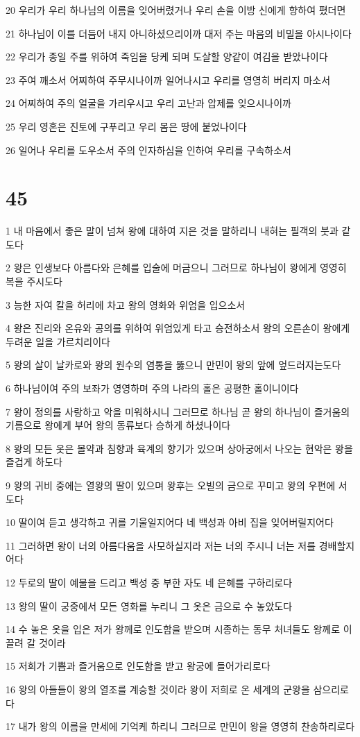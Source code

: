 \par 20 우리가 우리 하나님의 이름을 잊어버렸거나 우리 손을 이방 신에게 향하여 폈더면
\par 21 하나님이 이를 더듬어 내지 아니하셨으리이까 대저 주는 마음의 비밀을 아시나이다
\par 22 우리가 종일 주를 위하여 죽임을 당케 되며 도살할 양같이 여김을 받았나이다
\par 23 주여 깨소서 어찌하여 주무시나이까 일어나시고 우리를 영영히 버리지 마소서
\par 24 어찌하여 주의 얼굴을 가리우시고 우리 고난과 압제를 잊으시나이까
\par 25 우리 영혼은 진토에 구푸리고 우리 몸은 땅에 붙었나이다
\par 26 일어나 우리를 도우소서 주의 인자하심을 인하여 우리를 구속하소서

\chapter{45}

\par 1 내 마음에서 좋은 말이 넘쳐 왕에 대하여 지은 것을 말하리니 내혀는 필객의 붓과 같도다
\par 2 왕은 인생보다 아름다와 은혜를 입술에 머금으니 그러므로 하나님이 왕에게 영영히 복을 주시도다
\par 3 능한 자여 칼을 허리에 차고 왕의 영화와 위엄을 입으소서
\par 4 왕은 진리와 온유와 공의를 위하여 위엄있게 타고 승전하소서 왕의 오른손이 왕에게 두려운 일을 가르치리이다
\par 5 왕의 살이 날카로와 왕의 원수의 염통을 뚫으니 만민이 왕의 앞에 엎드러지는도다
\par 6 하나님이여 주의 보좌가 영영하며 주의 나라의 홀은 공평한 홀이니이다
\par 7 왕이 정의를 사랑하고 악을 미워하시니 그러므로 하나님 곧 왕의 하나님이 즐거움의 기름으로 왕에게 부어 왕의 동류보다 승하게 하셨나이다
\par 8 왕의 모든 옷은 몰약과 침향과 육계의 향기가 있으며 상아궁에서 나오는 현악은 왕을 즐겁게 하도다
\par 9 왕의 귀비 중에는 열왕의 딸이 있으며 왕후는 오빌의 금으로 꾸미고 왕의 우편에 서도다
\par 10 딸이여 듣고 생각하고 귀를 기울일지어다 네 백성과 아비 집을 잊어버릴지어다
\par 11 그러하면 왕이 너의 아름다움을 사모하실지라 저는 너의 주시니 너는 저를 경배할지어다
\par 12 두로의 딸이 예물을 드리고 백성 중 부한 자도 네 은혜를 구하리로다
\par 13 왕의 딸이 궁중에서 모든 영화를 누리니 그 옷은 금으로 수 놓았도다
\par 14 수 놓은 옷을 입은 저가 왕께로 인도함을 받으며 시종하는 동무 처녀들도 왕께로 이끌려 갈 것이라
\par 15 저희가 기쁨과 즐거움으로 인도함을 받고 왕궁에 들어가리로다
\par 16 왕의 아들들이 왕의 열조를 계승할 것이라 왕이 저희로 온 세계의 군왕을 삼으리로다
\par 17 내가 왕의 이름을 만세에 기억케 하리니 그러므로 만민이 왕을 영영히 찬송하리로다

